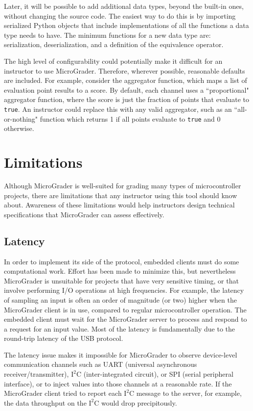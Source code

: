 \documentclass[12pt]{article}
\begin{document}
Later, it will be possible to add additional data types, beyond the built-in ones, without changing the source code.  The easiest way to do this is by importing serialized \cite{pickle} Python objects that include implementations of all the functions a data type needs to have.  The minimum functions for a new data type are: serialization, deserialization, and a definition of the equivalence operator.

The high level of configurability could potentially make it difficult for an instructor to use MicroGrader.  Therefore, wherever possible, reasonable defaults are included.  For example, consider the aggregator function, which maps a list of evaluation point results to a score.  By default, each channel uses a ``proportional" aggregator function, where the score is just the fraction of points that evaluate to \texttt{true}.  An instructor could replace this with any valid aggregator, such as an ``all-or-nothing" function which returns 1 if all points evaluate to \texttt{true} and 0 otherwise.


\clearpage
\section{Limitations}
Although MicroGrader is well-suited for grading many types of microcontroller projects, there are limitations that any instructor using this tool should know about.  Awareness of these limitations would help instructors design technical specifications that MicroGrader can assess effectively.

\subsection{Latency}
In order to implement its side of the protocol, embedded clients must do some computational work.  Effort has been made to minimize this, but nevertheless MicroGrader is unsuitable for projects that have very sensitive timing, or that involve performing I/O operations at high frequencies.  For example, the latency of sampling an input is often an order of magnitude (or two) higher when the MicroGrader client is in use, compared to regular microcontroller operation.  The embedded client must wait for the MicroGrader server to process and respond to a request for an input value.  Most of the latency is fundamentally due to the round-trip latency of the USB protocol.

The latency issue makes it impossible for MicroGrader to observe device-level communication channels such as UART (universal asynchronous receiver/transmitter), $\text{I}^2\text{C}$ (inter-integrated circuit), or SPI (serial peripheral interface), or to inject values into those channels at a reasonable rate.  If the MicroGrader client tried to report each $\text{I}^2\text{C}$ message to the server, for example, the data throughput on the $\text{I}^2\text{C}$ would drop precipitously.
\end{document}
